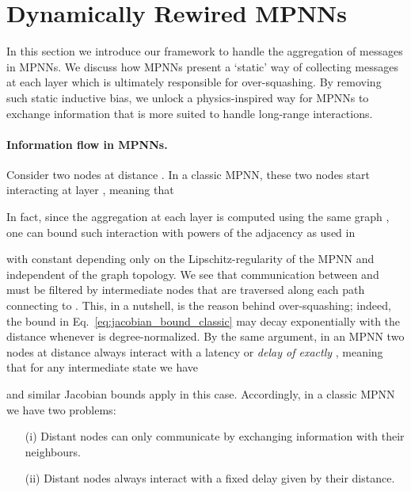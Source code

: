 \documentclass{article}
\theoremstyle{plain}
\theoremstyle{definition}
\theoremstyle{remark}
\begin{document}
\section{Dynamically Rewired MPNNs}\label{sec:our_framework}
In this section we introduce our framework to handle the aggregation of messages in MPNNs. We discuss how MPNNs present a `static' way of collecting messages at each layer which is ultimately responsible for over-squashing. By removing such static inductive bias, we unlock a physics-inspired way for MPNNs to exchange information that is more suited to handle long-range interactions.

\paragraph{Information flow in MPNNs.} Consider two nodes  at distance . In a classic MPNN, these two nodes start interacting
at layer , meaning that


\noindent In fact, since the aggregation at each layer is computed using the same graph , one can bound such interaction with powers of the adjacency  as used in \citet{topping2021understanding}

\noindent with constant  depending only on the Lipschitz-regularity of the MPNN and independent of the graph topology. We see that communication between  and  must be filtered by intermediate nodes that are traversed along each path connecting  to . This, in a nutshell, is the reason behind over-squashing; indeed, the bound in Eq.~\eqref{eq:jacobian_bound_classic} may decay exponentially with the distance  whenever  is degree-normalized. By the same argument, in an MPNN two nodes at distance  always interact with a latency or {\em delay of exactly} , meaning that for any intermediate state  we have

\noindent and similar Jacobian bounds apply in this case. Accordingly, in a classic MPNN we have two problems:
\begin{itemize}
\item[(i)] Distant nodes can only communicate by exchanging information with their neighbours.
\item[(ii)] Distant nodes always interact with a fixed delay given by their distance.
\end{itemize}
\end{document}
